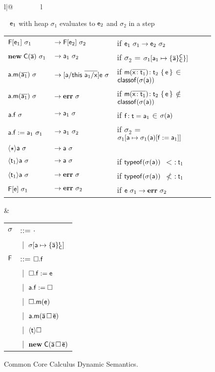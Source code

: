 \documentclass[preprint]{sigplanconf}
\newcommand{\m}{\M{\xt{m}}}
\newcommand{\e}{\M{\xt{e}}}
\newcommand{\f}{\M{\xt{f}}}
\newcommand{\x}{\M{\xt{x}}}
\renewcommand{\t}{\M{\xt{t}}}
\newcommand{\C}{\M{\xt{C}}}
\newcommand{\this}{\M{\xt{this}}}
\newcommand{\err}{\M{\bt{err}}}
\newcommand{\s}{\M{\sigma}}
\renewcommand{\a}{\M{\xt a}}
\newcommand{\F}{\M{\xt F}}
\newcommand{\tp}[1]{\M{ \t_{#1} }}
\newcommand{\ep}[1]{\M{ \e_{#1} }}
\newcommand{\ap}[1]{\M{ \a_{#1} }}
\renewcommand{\sp}[1]{\M{ \s_{#1} }}
\newcommand{\none}{\M{\cdot}}
\newcommand{\new}{\M{\bt{new}}}
\newcommand{\Get}[2]{\M{#1.#2}}
\newcommand{\Set}[3]{\M{#1.#2:=#3}}
\newcommand{\Call}[3]{\M{#1.#2(#3)}}
\newcommand{\New}[2]{\M{\new\;#1({#2})}}
\newcommand{\Cast}[2]{\M{\langle{#1}\rangle{#2}}}
\newcommand{\any}{\M{\star}}
\newcommand{\HT}[2]{\M{{#1}\!:{#2}}}
\newcommand{\Mdef}[5]{\M{ \HT { #1( \b{\HT{#2}{#3}})}{#4}~ \{\, {#5} \,\} }}
\newcommand{\Fdef}[3]{\M{ \HT{#1}{#2}={#3} }}
\newcommand{\is}{\M{\mapsto}}
\newcommand{\Obj}[3]{ \M{\{ #1 \}^{#2}_{#3}}}
\newcommand{\Heap}[2]{\M{ #1[ #2 ] }}
\newcommand{\Alt}[1]{ &\B #1 \\}
\newcommand{\B}{\M{~|~}}
\newcommand{\M}[1]{\ensuremath{#1}\xspace}
\newcommand{\xt}[1]{{\sf{#1}}\xspace}
\newcommand{\bt}[1]{\xt{\bf #1}}
\renewcommand{\b}[1]{\M{\overline{#1}}}
\newcommand{\opdef}[2]{\framebox[1.1\width]{#1} ~ #2\\}
\newcommand{\CondRule}[3]{ #3 & {if} #2 \\}
\newcommand{\NoCondRule}[2]{ #2 &       \\}
\newcommand{\Reduce}[4]{\M{ #1~#2 \rightarrow #3~#4}}
\newcommand{\ReduceA}[4]{\M{ #1 ~ #2 } &  \M { \rightarrow #3 ~ #4}}
\newcommand{\inc}{\M{\in}}
\newcommand{\Update}[3]{\M{#1[ #2 := #3]}}
\newcommand{\Bind}[2]{\M{#1 \is #2}}
\newcommand{\NotSub}{\M{\not<:}}
\newcommand{\Sub}{\M{<:}}
\newcommand{\classof}[1]{\M{\xt{classof}(#1)}}
\newcommand{\typeof}[1]{\M{\xt{typeof}(#1)}}
\newcommand{\Sel}[2]{\M{#1(#2)}}
\begin{document}
\begin{figure*}
\begin{tabular}{l|@{~~~~~~~~}l}
\begin{minipage}{11cm}
\opdef{\Reduce{\ep 1}{\sp 1}{\ep 2}{\sp 2}}{\ep 1 with heap \sp 1 evaluates to \ep 2 and \sp 2 in a step}
\begin{tabular}{@{}l@{}l@{~}l@{~}l}
\CondRule{E1}{ 
  \Reduce {\ep 1}{\sp 1}{\ep 2}{\sp 2}
}{
  \ReduceA {\F[\ep 1]}{\sp 1}{\F[\ep 2]}{\sp 2}
}
\CondRule{E2}{
     \sp2 = \Heap{\sp1}{\Bind{\ap1}{\Obj{\b\a}\C\C\}}}
}{ 
    \ReduceA{ \New\C{\b\a} }{\sp1}{\ap1}{\sp 2}
}
\CondRule{E3}{
     \Mdef\m\x{\tp 1}{\tp 2}\e\inc \classof{\Sel\s\a}
}{
   \ReduceA{\Call\a\m{\b{\ap 1}}}\s{[\a/\this~\b{{\ap 1}/\x}]\e}\s
}

\CondRule{E3}{
     \Mdef\m\x{\tp 1}{\tp 2}\e\M{\not\in} \classof{\Sel\s\a}
}{
   \ReduceA{\Call\a\m{\b{\ap 1}}}\s{\err}\s
}

\CondRule{E3}{ 
     \Fdef\f\t{\ap 1}\inc \Sel\s\a
}{
  \ReduceA{\Get\a\f}{\s}{\ap 1}{\s}
}
\CondRule{E4}{
     \sp 2 = \Heap{\sp 1}{\Bind\a{\Update{\Sel{\sp 1}\a}\f {\ap 1}}}
}{
     \ReduceA{\Set\a\f{\ap 1}}{\sp 1}{\ap 1}{\sp 2}
}
\NoCondRule{E5}
{ 
   \ReduceA{ \Cast\any\a}\s \a\s
}
\CondRule{E6}{
  \typeof{\Sel\s\a} \Sub \tp 1
}{ 
    \ReduceA{\Cast{\tp 1}\a}\s\a\s
}
\CondRule{E7}{
  \typeof{\Sel\s\a} \NotSub \tp 1
}{ 
    \ReduceA{\Cast{\tp 1}\a}\s\err\s
}
\CondRule{E8}{
    \Reduce\e{\sp 1}\err{\sp 2}
}{
    \ReduceA{\F[\e]}{\sp1}\err{\sp 2}
}
\end{tabular}\end{minipage}&
\begin{minipage}{4cm}\begin{tabular}{l@{~~}l}
\s &::= \none \\
\Alt{  \Heap\s{\Bind\a{\Obj{\b\a}{\t}{\C}}} } 
\F &::=    \Get\square\f \\
   \Alt{    \Set\square\f\e}
   \Alt{    \Set\a\f\square    }
   \Alt{    \Call\square\m\e}
   \Alt{    \Call\a\m{\b\a\,\square\,\b\e}}
    \Alt{   \Cast\t\square }
   \Alt{   \New\C{\b \a\,\square\,\b\e}}
\end{tabular}
\end{minipage}\end{tabular}
\caption{Common Core Calculus Dynamic Semantics.}
\end{figure*}
\end{document}
